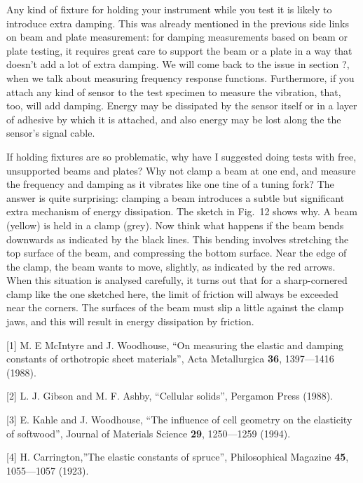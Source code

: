   Any kind of fixture for holding your instrument while you test it is likely 
  to introduce extra damping. This was already mentioned in the previous side 
  links on beam and plate measurement: for damping measurements based on beam 
  or plate testing, it requires great care to support the beam or a plate in a 
  way that doesn’t add a lot of extra damping. We will come back to the issue 
  in section ?, when we talk about measuring frequency response functions. 
  Furthermore, if you attach any kind of sensor to the test specimen to measure 
  the vibration, that, too, will add damping. Energy may be dissipated by the 
  sensor itself or in a layer of adhesive by which it is attached, and also 
  energy may be lost along the the sensor’s signal cable. 

  If holding fixtures are so problematic, why have I suggested doing tests with 
  free, unsupported beams and plates? Why not clamp a beam at one end, and 
  measure the frequency and damping as it vibrates like one tine of a tuning 
  fork? The answer is quite surprising: clamping a beam introduces a subtle but 
  significant extra mechanism of energy dissipation. The sketch in Fig.\ 12 
  shows why. A beam (yellow) is held in a clamp (grey). Now think what happens 
  if the beam bends downwards as indicated by the black lines. This bending 
  involves stretching the top surface of the beam, and compressing the bottom 
  surface. Near the edge of the clamp, the beam wants to move, slightly, as 
  indicated by the red arrows. When this situation is analysed carefully, it 
  turns out that for a sharp-cornered clamp like the one sketched here, the 
  limit of friction will always be exceeded near the corners. The surfaces of 
  the beam must slip a little against the clamp jaws, and this will result in 
  energy dissipation by friction. 



  \sectionreferences{}[1] M. E McIntyre and J. Woodhouse, “On measuring the 
  elastic and damping constants of orthotropic sheet materials”, Acta 
  Metallurgica \textbf{36}, 1397—1416 (1988). 

  [2] L. J. Gibson and M. F. Ashby, “Cellular solids”, Pergamon Press (1988). 

  [3] E. Kahle and J. Woodhouse, “The influence of cell geometry on the 
  elasticity of softwood”, Journal of Materials Science \textbf{29}, 1250—1259 
  (1994). 

  [4] H. Carrington,”The elastic constants of spruce”, Philosophical Magazine 
  \textbf{45}, 1055—1057 (1923). 